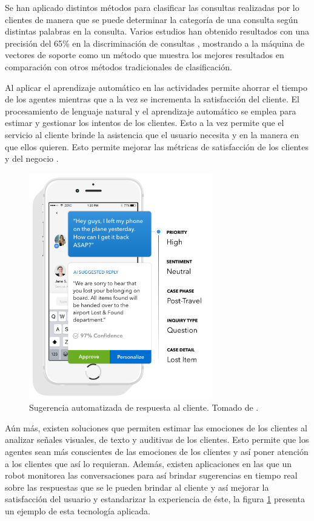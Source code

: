 \documentclass[conference]{IEEEtran}
\begin{document}
Se han aplicado distintos métodos para clasificar las consultas realizadas por lo clientes de manera que se puede determinar la categoría de una consulta según distintas palabras en la consulta. Varios estudios han obtenido resultados con una precisión del 65\% en la discriminación de consultas \cite{8554881}, mostrando a la máquina de vectores de soporte como un método que muestra los mejores resultados en comparación con otros métodos tradicionales de clasificación.

Al aplicar el aprendizaje automático en las actividades  permite ahorrar el tiempo de los agentes mientras que a la vez se incrementa la satisfacción del cliente. El procesamiento de lenguaje natural y el aprendizaje automático se emplea para estimar y gestionar los intentos de los clientes. Esto a la vez permite que el servicio al cliente brinde la asistencia que el usuario necesita y en la manera en que ellos quieren. Esto permite mejorar las métricas de satisfacción de los clientes y del negocio \cite{microsoft, ubercota, 8703237}.

\begin{figure}
\centering
\includegraphics[width=8cm]{IEEEtran/images/response_suggestion.png}
\caption{Sugerencia automatizada de respuesta al cliente. Tomado de \cite{digitalgenius}.}
\label{fig:response_suggestion}
\end{figure}

Aún más, existen soluciones que permiten estimar las emociones de los clientes al analizar señales visuales, de texto y auditivas de los clientes. Esto permite que los agentes sean más conscientes de las emociones de los clientes y así poner atención a los clientes que así lo requieran. Además, existen aplicaciones en las que un robot monitorea las conversaciones\cite{digitalgenius, ubercota} para así brindar sugerencias en tiempo real sobre las respuestas que se le pueden brindar al cliente y así mejorar la satisfacción del usuario y estandarizar la experiencia de éste, la figura \ref{fig:response_suggestion} presenta un ejemplo de esta tecnología aplicada.
\end{document}
